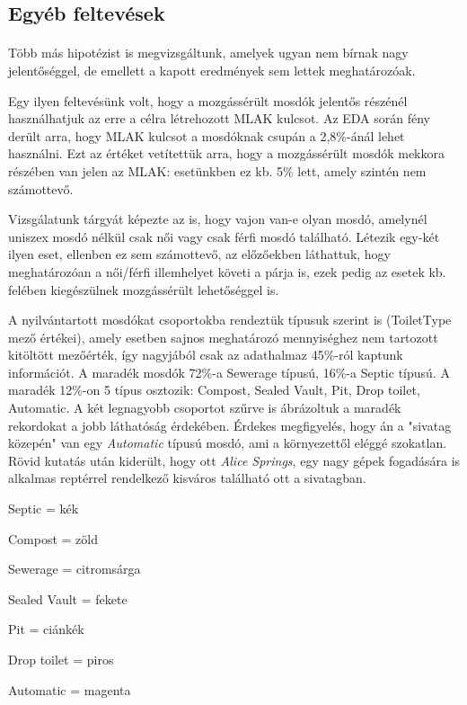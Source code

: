 	\subsection{Egyéb feltevések}
	\paragraph{}
	Több más hipotézist is megvizsgáltunk, amelyek ugyan nem bírnak nagy jelentőséggel, de emellett a kapott eredmények sem lettek meghatározóak.\par
	Egy ilyen feltevésünk volt, hogy a mozgássérült mosdók jelentős részénél használhatjuk az erre a célra létrehozott MLAK kulcsot. Az EDA során fény derült arra, hogy MLAK kulcsot a mosdóknak csupán a 2,8\%-ánál lehet használni. Ezt az értéket vetítettük arra, hogy a mozgássérült mosdók mekkora részében van jelen az MLAK: esetünkben ez kb. 5\% lett, amely szintén nem számottevő.\par
	Vizsgálatunk tárgyát képezte az is, hogy vajon van-e olyan mosdó, amelynél uniszex mosdó nélkül csak női vagy csak férfi mosdó található. Létezik egy-két ilyen eset, ellenben ez sem számottevő, az előzőekben láthattuk, hogy meghatározóan a női/férfi illemhelyet követi a párja is, ezek pedig az esetek kb. felében kiegészülnek mozgássérült lehetőséggel is.\par
	A nyilvántartott mosdókat csoportokba rendeztük típusuk szerint is (ToiletType mező értékei), amely esetben sajnos meghatározó mennyiséghez nem tartozott kitöltött mezőérték, így nagyjából csak az adathalmaz 45\%-ról kaptunk információt. A maradék mosdók 72\%-a Sewerage típusú, 16\%-a Septic típusú. A maradék 12\%-on 5 típus osztozik: Compost, Sealed Vault, Pit, Drop toilet, Automatic. A két legnagyobb csoportot  szűrve is ábrázoltuk a maradék rekordokat a jobb láthatóság érdekében. Érdekes megfigyelés, hogy án a "sivatag közepén" van egy \textit{Automatic} típusú mosdó, ami a környezettől eléggé szokatlan. Rövid kutatás után kiderült, hogy ott \textit{Alice Springs}, egy nagy gépek fogadására is alkalmas reptérrel rendelkező kisváros található ott a sivatagban.
	\begin{compactlist}
		\item Septic = kék
		\item Compost = zöld
		\item Sewerage = citromsárga
		\item Sealed Vault = fekete
		\item Pit = ciánkék
		\item Drop toilet = piros
		\item Automatic = magenta
	\end{compactlist}\par
